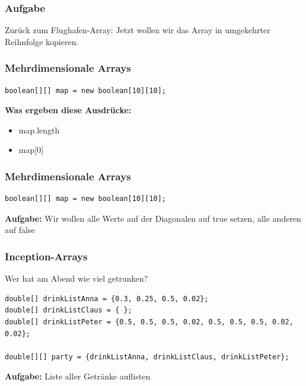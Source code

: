 \documentclass[18pt]{beamer}
\begin{document}

\begin{frame}[containsverbatim]
	\frametitle{Aufgabe}
		Zurück zum Flughafen-Array:
		Jetzt wollen wir das Array in umgekehrter Reihnfolge kopieren.
\end{frame}


\begin{frame}[containsverbatim]
	\frametitle{Mehrdimensionale Arrays}
		
		\begin{lstlisting}
boolean[][] map = new boolean[10][10];
		\end{lstlisting}
		
		\textbf{Was ergeben diese Ausdrücke:}
		\begin{itemize}
			\item map.length
			\item map[0]
		\end{itemize}
		
\end{frame}


\begin{frame}[containsverbatim]
	\frametitle{Mehrdimensionale Arrays}
		
		\begin{lstlisting}
boolean[][] map = new boolean[10][10];
		\end{lstlisting}
		
		\textbf{Aufgabe:} Wir wollen alle Werte auf der Diagonalen auf true setzen, alle anderen auf false
\end{frame}



\begin{frame}[containsverbatim]
	\frametitle{Inception-Arrays}
		
		Wer hat am Abend wie viel getrunken?
		\begin{lstlisting}
double[] drinkListAnna = {0.3, 0.25, 0.5, 0.02};
double[] drinkListClaus = { };
double[] drinkListPeter = {0.5, 0.5, 0.5, 0.02, 0.5, 0.5, 0.5, 0.02, 0.02};

double[][] party = {drinkListAnna, drinkListClaus, drinkListPeter};
		\end{lstlisting}
		
		\textbf{Aufgabe:} Liste aller Getränke auflisten
\end{frame}
\end{document}
